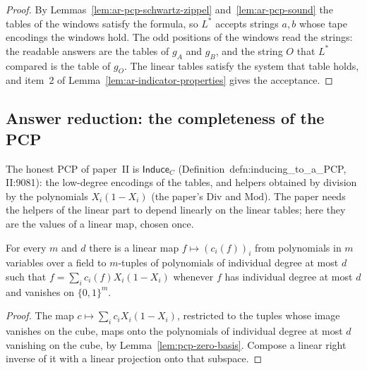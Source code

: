 \begin{proof}
\leanok
By Lemmas~\ref{lem:ar-pcp-schwartz-zippel} and~\ref{lem:ar-pcp-sound} the tables of the windows
satisfy the formula, so $L^*$ accepts strings $a, b$ whose tape encodings the windows hold. The
odd positions of the windows read the strings: the readable answers are the tables of $g_A$ and
$g_B$, and the string $O$ that $L^*$ compared is the table of $g_O$. The linear tables satisfy the
system that table holds, and item~2 of Lemma~\ref{lem:ar-indicator-properties} gives the
acceptance.
\end{proof}

\subsection{Answer reduction: the completeness of the PCP}

The honest PCP of paper~II is $\mathsf{Induce}_C$ (Definition~defn:inducing\_to\_a\_PCP,
II:9081): the low-degree encodings of the tables, and helpers obtained by division by the
polynomials $X_i(1 - X_i)$ (the paper's $\mathrm{Div}$ and $\mathrm{Mod}$). The paper needs the
helpers of the linear part to depend linearly on the linear tables; here they are the values of
a linear map, chosen once.

\begin{lemma}
\label{lem:ar-linear-certificates}
\leanok
For every $m$ and $d$ there is a linear map $f \mapsto (c_i(f))_i$ from polynomials in $m$
variables over a field to $m$-tuples of polynomials of individual degree at most $d$ such that
$f = \sum_i c_i(f) X_i (1 - X_i)$ whenever $f$ has individual degree at most $d$ and vanishes on
$\{0, 1\}^m$.
\end{lemma}

\begin{proof}
\leanok
The map $c \mapsto \sum_i c_i X_i (1 - X_i)$, restricted to the tuples whose image vanishes on the
cube, maps onto the polynomials of individual degree at most $d$ vanishing on the cube, by
Lemma~\ref{lem:pcp-zero-basis}. Compose a linear right inverse of it with a linear projection onto
that subspace.
\end{proof}

